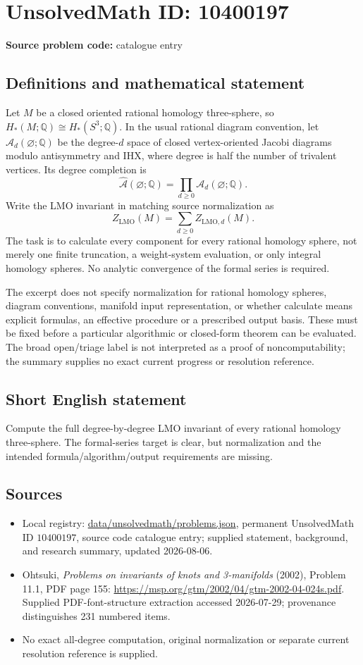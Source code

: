 \documentclass[11pt]{article}
\begin{document}
\section*{UnsolvedMath ID: 10400197}
\textbf{Source problem code:} catalogue entry
\subsection{Definitions and mathematical statement}
Let \(M\) be a closed oriented rational homology three-sphere, so \(H_*(M;\mathbb Q)\cong H_*(S^3;\mathbb Q)\). In the usual rational diagram convention, let \(\mathcal A_d(\varnothing;\mathbb Q)\) be the degree-\(d\) space of closed vertex-oriented Jacobi diagrams modulo antisymmetry and IHX, where degree is half the number of trivalent vertices. Its degree completion is
\[
 \widehat{\mathcal A}(\varnothing;\mathbb Q)=\prod_{d\ge0}\mathcal A_d(\varnothing;\mathbb Q).
\]
Write the LMO invariant in matching source normalization as
\[
 Z_{\mathrm{LMO}}(M)=\sum_{d\ge0}Z_{\mathrm{LMO},d}(M).
\]
The task is to calculate every component for every rational homology sphere, not merely one finite truncation, a weight-system evaluation, or only integral homology spheres. No analytic convergence of the formal series is required.

The excerpt does not specify normalization for rational homology spheres, diagram conventions, manifold input representation, or whether calculate means explicit formulas, an effective procedure or a prescribed output basis. These must be fixed before a particular algorithmic or closed-form theorem can be evaluated. The broad open/triage label is not interpreted as a proof of noncomputability; the summary supplies no exact current progress or resolution reference.
\subsection{Short English statement}
Compute the full degree-by-degree LMO invariant of every rational homology three-sphere. The formal-series target is clear, but normalization and the intended formula/algorithm/output requirements are missing.
\subsection{Sources}
\begin{itemize}
\item Local registry: \url{data/unsolvedmath/problems.json}, permanent UnsolvedMath ID \(10400197\), source code catalogue entry; supplied statement, background, and research summary, updated 2026-08-06.
\item Ohtsuki, \emph{Problems on invariants of knots and 3-manifolds} (2002), Problem 11.1, PDF page 155: \url{https://msp.org/gtm/2002/04/gtm-2002-04-024s.pdf}. Supplied PDF-font-structure extraction accessed 2026-07-29; provenance distinguishes 231 numbered items.
\item No exact all-degree computation, original normalization or separate current resolution reference is supplied.
\end{itemize}
\end{document}
